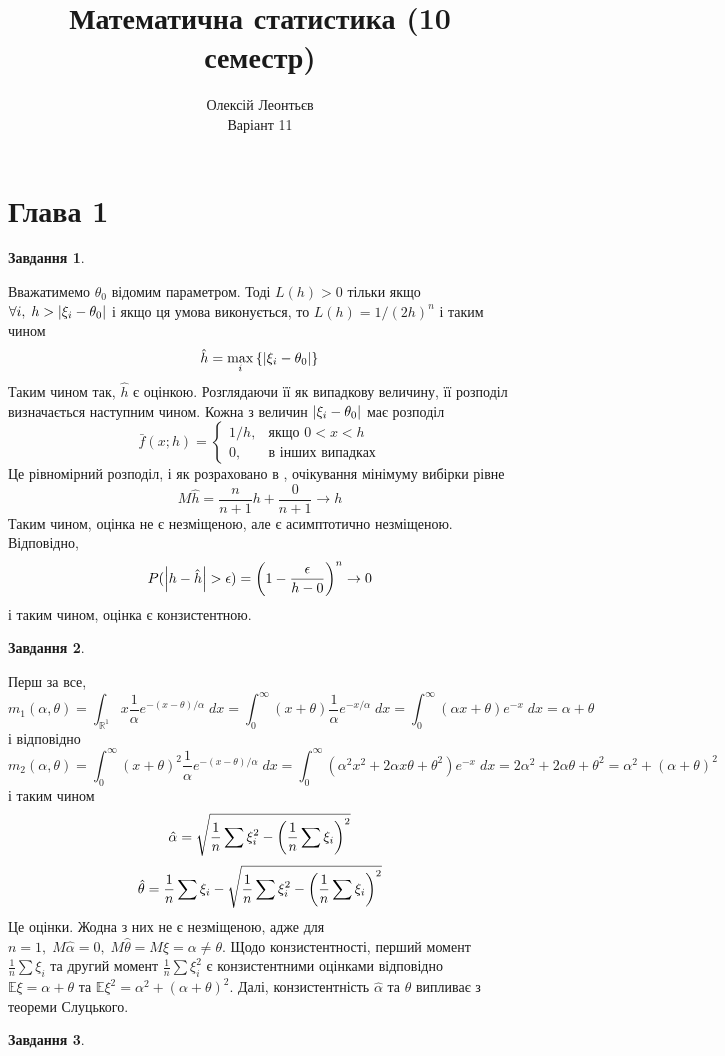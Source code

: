 \documentclass[12pt]{article} %
\title{Математична статистика (10 семестр)}
\author{Олексій Леонтьєв\\Варіант 11}
\newtheorem{prob}{Завдання}
\newcommand{\dx}{\;dx}
\begin{document}
\maketitle
\section{Глава 1}
\setcounter{prob}{30}
\begin{prob}\end{prob}
	Вважатимемо $\theta_0$ відомим параметром. Тоді $L(h)>0$ тільки якщо $\forall i,\;h>\left|\xi_i-\theta_0\right|$ і якщо ця
	умова виконується, то $L(h)=1/(2h)^n$ і таким чином
	\[\hat{h}=\max_i\mycbra{\myabs{\xi_i-\theta_0}}\]
	Таким чином так, $\hat{h}$ є оцінкою. Розглядаючи її як випадкову величину, її розподіл визначається наступним чином.
	Кожна з величин $\left|\xi_i-\theta_0\right|$ має розподіл
	\[\bar{f}(x;h)=\begin{cases}
		1/h,&\mbox{якщо }0<x<h\\
		0,&\mbox{в інших випадках}
	\end{cases}\]
	Це рівномірний розподіл, і як розраховано в \cite{turchin}, очікування мінімуму вибірки рівне
	\[M\hat{h}=\frac{n}{n+1}h+\frac{0}{n+1}\to h\]
	Таким чином, оцінка не є незміщеною, але є асимптотично незміщеною.
	Відповідно,
	\[P(\myabs{h-\hat{h}}>\epsilon)=\mybra{1-\frac{\epsilon}{h-0}}^n\to0\]
	і таким чином, оцінка є конзистентною.
\begin{prob}\end{prob}
	Перш за все, 
	\[m_1(\alpha,\theta)=\int_{\mathbb{R}^1} x\frac{1}{\alpha}e^{-(x-\theta)/\alpha}\dx=\int_0^\infty(x+\theta)\frac{1}{\alpha}
	e^{-x/\alpha}\dx=\int_0^\infty(\alpha x+\theta)e^{-x}\dx=\alpha+\theta\]
	і відповідно
	\[m_2(\alpha,\theta)=\int_0^\infty (x+\theta)^2\frac{1}{\alpha}e^{-(x-\theta)/\alpha}\dx=
	\int_0^\infty(\alpha^2x^2+2\alpha x\theta+\theta^2)e^{-x}\dx=2\alpha^2+2\alpha\theta+\theta^2=\alpha^2+(\alpha+\theta)^2\]
	і таким чином
	\[\hat{\alpha}=\sqrt{\frac{1}{n}\sum\xi_i^2-\mybra{\frac{1}{n}\sum\xi_i}^2}\]
	\[\hat{\theta}=\frac{1}{n}\sum\xi_i-\sqrt{\frac{1}{n}\sum\xi_i^2-\mybra{\frac{1}{n}\sum\xi_i}^2}\]
	Це оцінки. Жодна з них не є незміщеною, адже для $n=1,\;M\hat{\alpha}=0,\;M\hat{\theta}=M\xi=\alpha\neq\theta$. Щодо
	конзистентності, перший момент $\frac{1}{n}\sum\xi_i$ та другий момент $\frac{1}{n}\sum\xi_i^2$ є конзистентними
	оцінками відповідно $\mathbb{E}\xi=\alpha+\theta$ та $\mathbb{E}\xi^2=\alpha^2+(\alpha+\theta)^2$. Далі, конзистентність
	$\hat{\alpha}$ та $\hat{\theta}$ випливає з теореми Слуцького.
\begin{prob}\end{prob}
\end{document}
